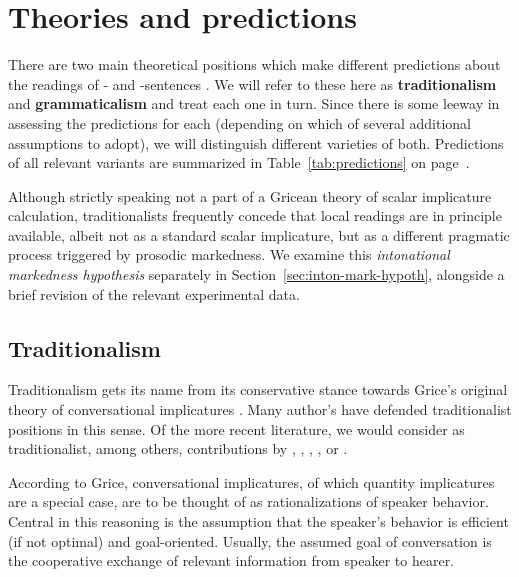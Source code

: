 \documentclass[fleqn,reqno,10pt,draft]{article}
\newcommand{\as}{\acro{as}}
\renewcommand{\es}{\acro{es}}
\renewcommand{\mymark}[1]{\textbf{#1}}
\begin{document}
\section{Theories and predictions}
\label{sec:theories-predictions}

There are two main theoretical positions which make different
predictions about the readings of \as- and \es-sentences
\citep[see][for
overview]{Horn2006:The-Border-Wars,Geurts2010:Quantity-Implic,Sauerland2012:The-Computation}. We
will refer to these here as \mymark{traditionalism} and
\mymark{grammaticalism} and treat each one in turn. Since there is
some leeway in assessing the predictions for each (depending on which
of several additional assumptions to adopt), we will distinguish
different varieties of both. Predictions of all relevant variants are
summarized in Table~\ref{tab:predictions} on
page~\pageref{tab:predictions}.

Although strictly speaking not a part of a Gricean theory of scalar
implicature calculation, traditionalists frequently concede that local
readings are in principle available, albeit not as a standard scalar
implicature, but as a different pragmatic process triggered by
prosodic markedness. We examine this \emph{intonational markedness
  hypothesis} separately in Section~\ref{sec:inton-mark-hypoth},
alongside a brief revision of the relevant experimental data.

\subsection{Traditionalism}
\label{sec:traditionalism}

Traditionalism gets its name from its conservative stance towards
Grice's original theory of conversational implicatures
\citep{Grice1975:Logic-and-Conve}. Many author's have defended
traditionalist positions in this sense. Of the more recent literature,
we would consider as traditionalist, among others, contributions by
\citet{Spector2006:Scalar-Implicat},
\citet{Sauerland2004:Scalar-Implicat},
\citet{Russell2006:Against-Grammat},
\citet{vanRooijSchulz:ExhaustiveInterpretation},
\citet{Geurts2010:Quantity-Implic} or
\citet{Franke2011:Quantity-Implic}.

According to Grice, conversational implicatures, of which quantity
implicatures are a special case, are to be thought of as
rationalizations of speaker behavior. Central in this reasoning is the
assumption that the speaker's behavior is efficient (if not optimal)
and goal-oriented. Usually, the assumed goal of conversation is the
cooperative exchange of relevant information from speaker to hearer.
\end{document}
